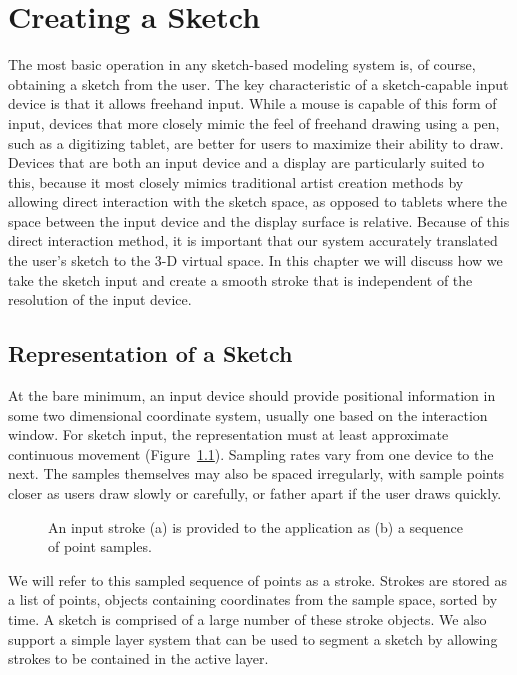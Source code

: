 \chapter{Creating a Sketch}

The most basic operation in any sketch-based modeling system is, of course, obtaining a sketch from the user.
The key characteristic of a sketch-capable input device is that it allows freehand input.
While a mouse is capable of this form of input, devices that more closely mimic the feel of freehand drawing using a pen, such as a digitizing tablet, are better for users to maximize their ability to draw.
Devices that are both an input device and a display are particularly suited to this, because it most closely mimics traditional artist creation methods by allowing direct interaction with the sketch space, as opposed to tablets where the space between the input device and the display surface is relative.
Because of this direct interaction method, it is important that our system accurately translated the user's sketch to the 3-D virtual space.
In this chapter we will discuss how we take the sketch input and create a smooth stroke that is independent of the resolution of the input device.

\section{Representation of a Sketch}

At the bare minimum, an input device should provide positional information in some two dimensional coordinate system, usually one based on the interaction window.
For sketch input, the representation must at least approximate continuous movement (Figure~\ref{fig:sampledata}).
Sampling rates vary from one device to the next.
The samples themselves may also be spaced irregularly, with sample points closer as users draw slowly or carefully, or father apart if the user draws quickly.

\begin{figure}
\label{fig:sampledata}
\caption{An input stroke (a) is provided to the application as (b) a sequence of point samples.}
\end{figure}

We will refer to this sampled sequence of points as a stroke. 
Strokes are stored as a list of points, objects containing coordinates from the sample space, sorted by time.
A sketch is comprised of a large number of these stroke objects.
We also support a simple layer system that can be used to segment a sketch by allowing strokes to be contained in the active layer.

